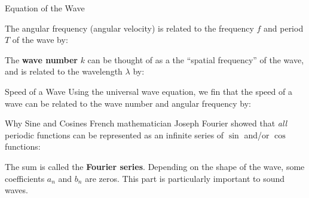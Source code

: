 \documentclass[12pt,aspectratio=169]{beamer}
\newcommand{\eq}[2]{\vspace{#1}{\Large\begin{displaymath}#2\end{displaymath}}}
\begin{document}
\begin{frame}{Equation of the Wave}
  \eq{-.1in}{
    \boxed{u(x,t)=A\sin(kx-\omega t)}
  }

  \vspace{-.1in}The angular frequency (angular velocity) is related to the
  frequency $f$ and period $T$ of the wave by:

  \eq{-.35in}{
    \omega=\frac{2\pi}{T}=2\pi f
  }

  The \textbf{wave number} $k$ can be thought of as a the ``spatial frequency''
  of the wave, and is related to the wavelength $\lambda$ by:
  
  \eq{-.2in}{
    k=\frac{2\pi}{\lambda}
  }
\end{frame}


\begin{frame}{Speed of a Wave}
  Using the universal wave equation, we fin that the speed of a wave can be
  related to the wave number and angular frequency by:

  \eq{-.2in}{
    v=\frac{\lambda}{T}=\frac{2\pi/k}{2\pi/\omega}=\frac{\omega}{k}
  }
\end{frame}



\begin{frame}{Why Sine and Cosines}
  French mathematician Joseph Fourier showed that \emph{all} periodic functions
  can be represented as an infinite series of $\sin$ and/or $\cos$ functions:


  The sum is called the \textbf{Fourier series}. Depending on the shape of the
  wave, some coefficients $a_n$ and $b_n$ are zeros. This part is particularly
  important to sound waves.
\end{frame}
\end{document}
